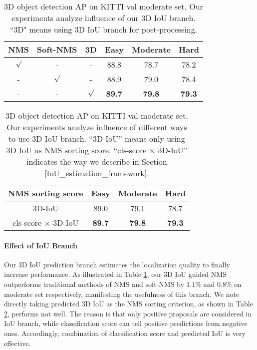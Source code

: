 \documentclass[10pt,twocolumn,letterpaper]{article}
\begin{document}
\begin{table}[t]
	\centering \addtolength{\tabcolsep}{-1pt}
	\footnotesize
	\begin{tabular}{|c|c|c|c|c|c|}
		\hline
		NMS & Soft-NMS & 3D & Easy & Moderate & Hard \\
		\hline
		$\surd$ & - & - & 88.8 & 78.7 & 78.2 \\
		- & $\surd$ & - & 88.9 & 79.0 & 78.4 \\
		- & - & $\surd$ & \bf 89.7 & \bf 79.8 & \bf 79.3 \\
		\hline
	\end{tabular}\vspace{0.1cm}
	\caption{3D object detection AP on KITTI val moderate set. Our experiments analyze influence of our 3D IoU branch. ``3D" means using 3D IoU branch for post-processing.}
	\label{tab:whether_iou_branch}
\end{table}

\begin{table}[t]
	\centering \addtolength{\tabcolsep}{-1pt}
	\footnotesize
	\begin{tabular}{|c|c|c|c|}
		\hline
		NMS sorting score & Easy & Moderate & Hard \\
		\hline
		3D-IoU & 89.0 & 79.1 & 78.7 \\
		cls-score $\times$ 3D-IoU & \bf 89.7 & \bf 79.8 & \bf 79.3 \\
		\hline
	\end{tabular}\vspace{0.1cm}
	\caption{3D object detection AP on KITTI val moderate set. Our experiments analyze influence of different ways to use 3D IoU branch. ``3D-IoU'' means only using 3D IoU as NMS sorting score. ``cls-score $\times$ 3D-IoU'' indicates the way we describe in Section \ref{IoU_estimation_framework}.\vspace{-0.1in}}
	\label{tab:way_of_iou_branch}
\end{table}

\vspace{-0.1in}
\paragraph{Effect of IoU Branch}
Our 3D IoU prediction branch estimates the localization quality to finally increase performance. As illustrated in Table \ref{tab:whether_iou_branch}, our 3D IoU guided NMS outperforms traditional methods of NMS and soft-NMS by $1.1 \%$ and $0.8 \%$ on moderate set respectively, manifesting the usefulness of this branch. We note directly taking predicted 3D IoU as the NMS sorting criterion, as shown in Table \ref{tab:way_of_iou_branch}, performs not well. The reason is that only positive proposals are considered in IoU branch, while classification score can tell positive predictions from negative ones. Accordingly, combination of classification score and predicted IoU is very effective.
\end{document}
